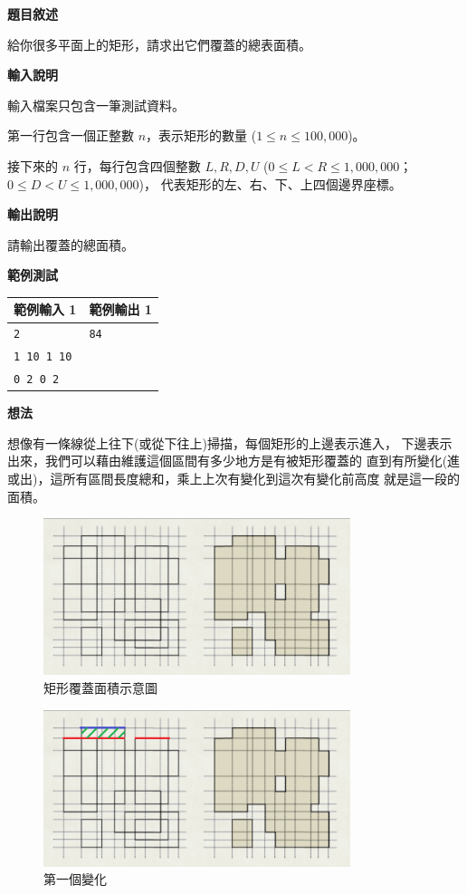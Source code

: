    \textbf{題目敘述}

    給你很多平面上的矩形，請求出它們覆蓋的總表面積。

    \textbf{輸入說明}

    輸入檔案只包含一筆測試資料。

    第一行包含一個正整數 $n$，表示矩形的數量 ($1 \leq n \leq 100,000$)。

    接下來的 $n$ 行，每行包含四個整數 $L, R, D, U$ ($0 \leq L < R \leq 1,000,000$；$0 \leq D < U \leq 1,000,000$)，
    代表矩形的左、右、下、上四個邊界座標。

    \textbf{輸出說明}

    請輸出覆蓋的總面積。

    \textbf{範例測試}

    \begin{tabular}{|m{7cm}|m{7cm}|}
        \hline
        範例輸入 1 & 範例輸出 1 \\
        \hline
        \verb|2|  & \verb|84| \\
        \verb|1 10 1 10|  & \\
        \verb|0 2 0 2|  &\\
        \hline
    \end{tabular}

    \textbf{想法}

    想像有一條線從上往下(或從下往上)掃描，每個矩形的上邊表示進入，
    下邊表示出來，我們可以藉由維護這個區間有多少地方是有被矩形覆蓋的
    直到有所變化(進或出)，這所有區間長度總和，乘上上次有變化到這次有變化前高度
    就是這一段的面積。

    \begin{figure}[!htbp]
        \centering
        \includegraphics[width=0.8\textwidth]{../Images/LazyTag1.png}
        \caption{矩形覆蓋面積示意圖}
    \end{figure}

    \begin{figure}[!htbp]
        \centering
        \includegraphics[width=0.8\textwidth]{../Images/LazyTag2.png}
        \caption{第一個變化}
    \end{figure}

